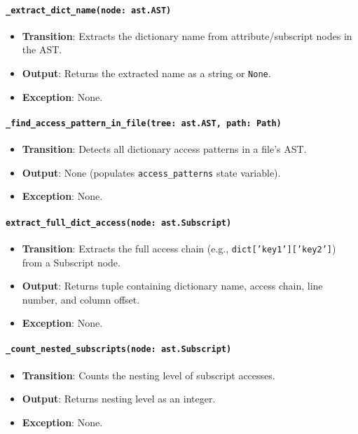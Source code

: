 \documentclass[12pt, titlepage]{article}
\begin{document}
\paragraph{\texttt{\_extract\_dict\_name(node: ast.AST)}}
\begin{itemize}
\item \textbf{Transition}: Extracts the dictionary name from attribute/subscript nodes in the AST.
\item \textbf{Output}: Returns the extracted name as a string or \texttt{None}.
\item \textbf{Exception}: None.
\end{itemize}

\paragraph{\texttt{\_find\_access\_pattern\_in\_file(tree: ast.AST, path: Path)}}
\begin{itemize}
\item \textbf{Transition}: Detects all dictionary access patterns in a file's AST.
\item \textbf{Output}: None (populates \texttt{access\_patterns} state variable).
\item \textbf{Exception}: None.
\end{itemize}

\paragraph{\texttt{extract\_full\_dict\_access(node: ast.Subscript)}}
\begin{itemize}
\item \textbf{Transition}: Extracts the full access chain (e.g., \texttt{dict['key1']['key2']}) from a Subscript node.
\item \textbf{Output}: Returns tuple containing dictionary name, access chain, line number, and column offset.
\item \textbf{Exception}: None.
\end{itemize}

\paragraph{\texttt{\_count\_nested\_subscripts(node: ast.Subscript)}}
\begin{itemize}
\item \textbf{Transition}: Counts the nesting level of subscript accesses.
\item \textbf{Output}: Returns nesting level as an integer.
\item \textbf{Exception}: None.
\end{itemize}
\end{document}
